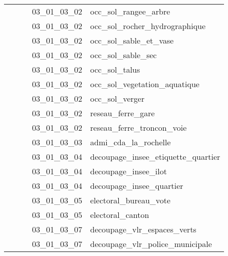 \documentclass[12pt,titlepage,oneside]{book}
\begin{document}
\begin{supertabular}{|p{7.5cm}|p{7.5cm}|p{7.5cm}|c|p{10cm}|}
                   &                    &                    & 03\_01\_03\_02 & occ\_sol\_rangee\_arbre\\
                   &                    &                    & 03\_01\_03\_02 & occ\_sol\_rocher\_hydrographique\\
                   &                    &                    & 03\_01\_03\_02 & occ\_sol\_sable\_et\_vase\\
                   &                    &                    & 03\_01\_03\_02 & occ\_sol\_sable\_sec\\
                   &                    &                    & 03\_01\_03\_02 & occ\_sol\_talus\\
                   &                    &                    & 03\_01\_03\_02 & occ\_sol\_vegetation\_aquatique\\
                   &                    &                    & 03\_01\_03\_02 & occ\_sol\_verger\\
                   &                    &                    & 03\_01\_03\_02 & reseau\_ferre\_gare\\
                   &                    &                    & 03\_01\_03\_02 & reseau\_ferre\_troncon\_voie\\
                   &                    &                    & 03\_01\_03\_03 & admi\_cda\_la\_rochelle\\
                   &                    &                    & 03\_01\_03\_04 & decoupage\_insee\_etiquette\_quartier\\
                   &                    &                    & 03\_01\_03\_04 & decoupage\_insee\_ilot\\
                   &                    &                    & 03\_01\_03\_04 & decoupage\_insee\_quartier\\
                   &                    &                    & 03\_01\_03\_05 & electoral\_bureau\_vote\\
                   &                    &                    & 03\_01\_03\_05 & electoral\_canton\\
                   &                    &                    & 03\_01\_03\_07 & decoupage\_vlr\_espaces\_verts\\
                   &                    &                    & 03\_01\_03\_07 & decoupage\_vlr\_police\_municipale\\

\end{supertabular}
\end{document}
